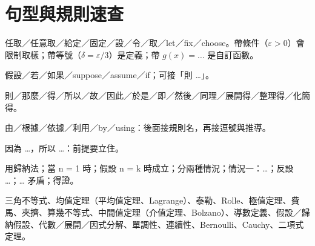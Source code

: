 \documentclass[11pt,a4paper,oneside]{book}
\renewcommand{\_}{\ifmmode\origunderscore\else\textunderscore\allowbreak\fi}
\begin{document}
\chapter{句型與規則速查}
\begin{description}[style=nextline,leftmargin=0pt,itemsep=4pt]
  \item[引入] 任取／任意取／給定／固定／設／令／取／let／fix／choose。帶條件（$\varepsilon > 0$）會限制取樣；帶等號（$\delta = \varepsilon/3$）是定義；帶 $g(x) = \ldots$ 是自訂函數。
  \item[假設] 假設／若／如果／suppose／assume／if；可接「則 …」。
  \item[推導] 則／那麼／得／所以／故／因此／於是／即／然後／同理／展開得／整理得／化簡得。
  \item[引用] 由／根據／依據／利用／by／using：後面接規則名，再接逗號與推導。
  \item[因果] 因為 …，所以 …：前提要立住。
  \item[結構] 用歸納法；當 n = 1 時；假設 n = k 時成立；分兩種情況；情況一：…；反設 …；… 矛盾；得證。
  \item[規則名] 三角不等式、均值定理（平均值定理、Lagrange）、泰勒、Rolle、極值定理、費馬、夾擠、算幾不等式、中間值定理（介值定理、Bolzano）、導數定義、假設／歸納假設、代數／展開／因式分解、單調性、連續性、Bernoulli、Cauchy、二項式定理。
\end{description}
\end{document}
